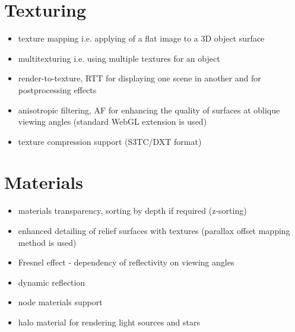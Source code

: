 \documentclass[a4paper,12pt,oneside]{sphinxmanual}
\begin{document}
\section{Texturing}
\label{features:id2}\begin{itemize}
\item {} 
texture mapping i.e. applying of a flat image to a 3D object surface

\item {} 
multitexturing i.e. using multiple textures for an object

\item {} 
render-to-texture, RTT for displaying one scene in another and for postprocessing effects

\item {} 
anisotropic filtering, AF for enhancing the quality of surfaces at oblique viewing angles (standard WebGL extension is used)

\item {} 
texture compression support (S3TC/DXT format)

\end{itemize}


\section{Materials}
\label{features:id3}\begin{itemize}
\item {} 
materials transparency, sorting by depth if required (z-sorting)

\item {} 
enhanced detailing of relief surfaces with textures (parallax offset mapping method is used)

\item {} 
Fresnel effect - dependency of reflectivity on viewing angles

\item {} 
dynamic reflection

\item {} 
node materials support

\item {} 
halo material for rendering light sources and stars

\end{itemize}
\end{document}
